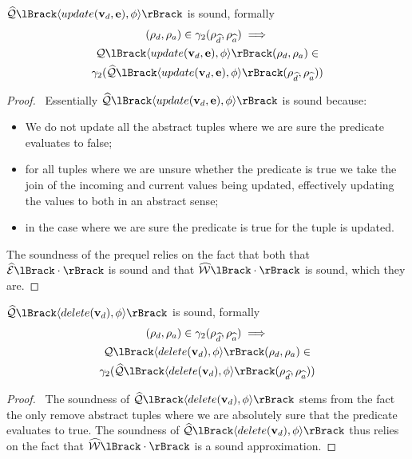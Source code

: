 \begin{conjecture}
    \label{thm:sound-update}
    $\abssqlsem{\langle update(\absattrs, \absexps), \abspred \rangle}$ is sound, formally
    \begin{multline*}
    (\rho_d, \rho_a)
        \in \concrete_2(\rho_{\ab{d}}, \rho_{\ab{a}}) \implies \\
        \sqlsem{\langle update(\absattrs, \absexps), \abspred \rangle}(\rho_d, \rho_a) \in \\
        \concrete_2(\abssqlsem{\langle update(\absattrs, \absexps), \abspred \rangle}(\rho_{\ab{d}}, \rho_{\ab{a}}))
    \end{multline*}
\end{conjecture}


\begin{proof}
    \pfsketch\
    Essentially $\abssqlsem{\langle update(\absattrs, \absexps), \abspred \rangle}$ is sound because:
    \begin{itemize}
        \item We do not update all the abstract tuples where we are sure the predicate evaluates to false;
        \item for all tuples where we are unsure whether the predicate is true we take the join of the incoming and current values being updated, effectively updating the values to both in an abstract sense;
        \item in the case where we are sure the predicate is true for the tuple is updated.
    \end{itemize}
    The soundness of the prequel relies on the fact that both that $\absexpsem{\cdot}$ is sound and that $\abspredsem{\cdot}$ is sound, which they are.
\end{proof}


\begin{conjecture}
    \label{thm:sound-delete}
    $\abssqlsem{\langle delete(\absattrs), \abspred \rangle}$ is sound, formally
    \begin{multline*}
    (\rho_d, \rho_a)
        \in \concrete_2(\rho_{\ab{d}}, \rho_{\ab{a}}) \implies \\
        \sqlsem{\langle delete(\absattrs), \abspred \rangle}(\rho_d, \rho_a) \in \\
        \concrete_2(\abssqlsem{\langle delete(\absattrs), \abspred \rangle}(\rho_{\ab{d}}, \rho_{\ab{a}}))
    \end{multline*}
\end{conjecture}


\begin{proof}
    \pfsketch\
    The soundness of $\abssqlsem{\langle delete(\absattrs), \abspred \rangle}$ stems from the fact the only remove abstract tuples where we are absolutely sure that the predicate evaluates to true.
    The soundness of $\abssqlsem{\langle delete(\absattrs), \abspred \rangle}$ thus relies on the fact that $\abspredsem{\cdot}$ is a sound approximation.
\end{proof}


